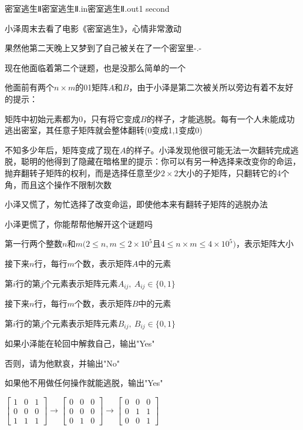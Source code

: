 \begin{problem}{密室逃生Ⅱ}{密室逃生Ⅱ.in}{密室逃生Ⅱ.out}{1 second}

小泽周末去看了电影《密室逃生》，心情非常激动

果然他第二天晚上又梦到了自己被关在了一个密室里-.-

现在他面临着第二个谜题，也是没那么简单的一个

他面前有两个$n\times m$的01矩阵$A$和$B$，由于小泽是第二次被关所以旁边有着不友好的提示：

矩阵中初始元素都为0，只有将它变成$B$的样子，才能逃脱。每有一个人未能成功逃出密室，其任意子矩阵就会整体翻转(0变成1,1变成0)

不知多少年后，矩阵变成了现在$A$的样子。小泽发现他很可能无法一次翻转完成逃脱，聪明的他得到了隐藏在暗格里的提示：你可以有另一种选择来改变你的命运，抛弃翻转子矩阵的权利，而是选择任意至少$2\times 2$大小的子矩阵，只翻转它的4个角，而且这个操作不限制次数

小泽又慌了，匆忙选择了改变命运，即使他本来有翻转子矩阵的逃脱办法

小泽更慌了，你能帮帮他解开这个谜题吗

\InputFile

第一行两个整数$n$和$m(2\le n,m \le 2\times 10^5$且$4\le n\times m\le 4\times 10^5)$，表示矩阵大小

接下来$n$行，每行$m$个数，表示矩阵$A$中的元素

第$i$行的第$j$个元素表示矩阵元素$A_{ij},\ A_{ij}\in \{0,1\}$

接下来$n$行，每行$m$个数，表示矩阵$B$中的元素

第$i$行的第$j$个元素表示矩阵元素$B_{ij},\ B_{ij}\in \{0,1\}$

\OutputFile

如果小泽能在轮回中解救自己，输出"Yes"

否则，请为他默哀，并输出"No"

如果他不用做任何操作就能逃脱，输出"Yes"

\Examples

\begin{example}
%
\end{example}
$\left[ \begin{matrix} 1 & 0 & 1 \\ 0 & 0 & 0 \\ 1 & 1 & 1 \end{matrix}\right] \to \left[ \begin{matrix} 0 & 0 & 0 \\ 0 & 0 & 0 \\ 0 & 1 & 0 \end{matrix}\right] \to \left[ \begin{matrix} 0 & 0 & 0 \\ 0 & 1 & 1 \\ 0 & 0 & 1 \end{matrix}\right]$
\end{problem}
